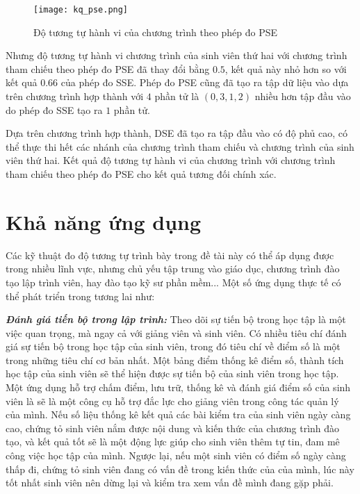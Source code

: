 \begin{figure}[H]
	\caption{Độ tương tự hành vi của chương trình theo phép đo PSE}	
	\label{fig:result-PSE}
	\begin{center}
		\texttt{[image: kq\_pse.png]}
	\end{center}	
\end{figure}

Nhưng độ tương tự hành vi chương trình của sinh viên thứ hai với chương trình tham chiếu theo phép đo PSE đã thay đổi bằng $ 0.5 $, kết quả này nhỏ hơn so với kết quả $ 0.66 $ của phép đo SSE. Phép đo PSE cũng đã tạo ra tập dữ liệu vào dựa trên chương trình hợp thành với $ 4 $ phần tử là $ (0, 3, 1, 2) $ nhiều hơn tập đầu vào do phép đo SSE tạo ra $ 1 $ phần tử.

Dựa trên chương trình hợp thành, DSE đã tạo ra tập đầu vào có độ phủ cao, có thể thực thi hết các nhánh của chương trình tham chiếu và chương trình của sinh viên thứ hai. Kết quả độ tương tự hành vi của chương trình với chương trình tham chiếu theo phép đo PSE cho kết quả tương đối chính xác.

\section{Khả năng ứng dụng}

Các kỹ thuật đo độ tương tự trình bày trong đề tài này có thể áp dụng
được trong nhiều lĩnh vực, nhưng chủ yếu tập trung vào giáo dục, chương trình đào tạo lập trình viên, hay đào tạo kỹ sư phần mềm... Một
số ứng dụng thực tế có thể phát triển trong tương lai như:

\textbf{\textit{Đánh giá tiến bộ trong lập trình:}} Theo dõi sự tiến
bộ trong học tập là một việc quan trọng, mà ngay cả với giảng viên và
sinh viên. Có nhiều tiêu chí đánh giá sự tiến bộ trong học tập của
sinh viên, trong đó tiêu chí về điểm số là một trong những tiêu chí cơ
bản nhất. Một bảng điểm thống kê điểm số, thành tích học tập của sinh
viên sẽ thể hiện được sự tiến bộ của sinh viên trong học tập. Một ứng
dụng hỗ trợ chấm điểm, lưu trữ, thống kê và đánh giá điểm số của sinh
viên là sẽ là một công cụ hỗ trợ đắc lực cho giảng viên trong công tác
quản lý của mình. Nếu số liệu thống kê kết quả các bài kiểm tra của
sinh viên ngày càng cao, chứng tỏ sinh viên nắm được nội dung và kiến
thức của chương trình đào tạo, và kết quả tốt sẽ là một động lực giúp
cho sinh viên thêm tự tin, đam mê công việc học tập của mình. Ngược
lại, nếu một sinh viên có điểm số ngày càng thấp đi, chứng tỏ sinh
viên đang có vấn đề trong kiến thức của của mình, lúc này tốt nhất
sinh viên nên dừng lại và kiểm tra xem vấn đề mình đang gặp phải.

